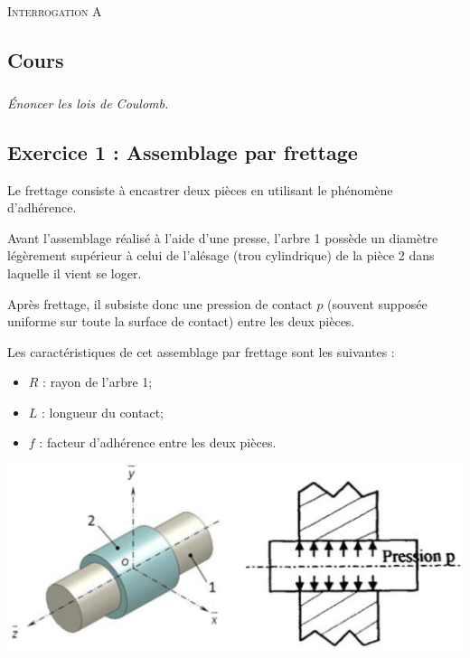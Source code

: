 \documentclass[10pt]{article}
\begin{document}

\begin{center}
\Large{\textsc{Interrogation A}}
\end{center}

\subsection*{Cours}
\subparagraph*{}
\textit{Énoncer les lois de Coulomb.}



\subsection*{Exercice 1 : Assemblage par frettage}
\begin{minipage}[c]{.5\linewidth}
Le frettage consiste à encastrer deux pièces en utilisant le phénomène d’adhérence. 
 
Avant l’assemblage réalisé à l’aide d’une presse, l’arbre 1 
possède un diamètre légèrement supérieur à celui de l’alésage 
(trou cylindrique) de la pièce 2 dans laquelle il vient se loger. 
 
Après frettage, il subsiste donc une pression de contact $p$ 
(souvent supposée uniforme sur toute la surface de contact) 
entre les deux pièces. 

 
Les caractéristiques de cet assemblage par frettage sont les suivantes : 
\begin{itemize}
\item $R$ : rayon de l’arbre 1;
\item $L$ : longueur du contact; 
\item $f$ : facteur d’adhérence entre les deux pièces.
\end{itemize}


\end{minipage}\hfill
\begin{minipage}[c]{.48\linewidth}
\begin{center}
\includegraphics[width=\textwidth]{images/fig_01}
\end{center}
\end{minipage}
\end{document}
